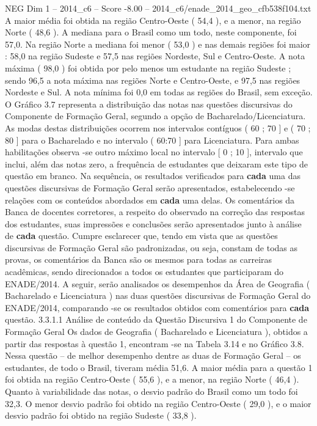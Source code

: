 \begin{textsample}{NEG Dim 1 – 2014\_c6 – Score -8.00 – 2014\_c6/enade\_2014\_geo\_cfb538f104.txt}
A maior média foi obtida na região Centro-Oeste ( 54,4 ), e a menor, na região Norte ( 48,6 ).
A mediana para o Brasil como um todo, neste componente, foi 57,0.
Na região Norte a mediana foi menor ( 53,0 ) e nas demais regiões foi maior : 58,0 na região Sudeste e 57,5 nas regiões Nordeste, Sul e Centro-Oeste.
A nota máxima ( 98,0 ) foi obtida por pelo menos um estudante na região Sudeste ; sendo 96,5 a nota máxima nas regiões Norte e Centro-Oeste, e 97,5 nas regiões Nordeste e Sul.
A nota mínima foi 0,0 em todas as regiões do Brasil, sem exceção.
O Gráfico 3.7 representa a distribuição das notas nas questões discursivas do Componente de Formação Geral, segundo a opção de Bacharelado/Licenciatura.
As modas destas distribuições ocorrem nos intervalos contíguos ( 60 ; 70 ] e ( 70 ; 80 ] para o Bacharelado e no intervalo ( 60:70 ] para Licenciatura.
Para ambas habilitações observa -se outro máximo local no intervalo [ 0 ; 10 ], intervalo que inclui, além das notas zero, a frequência de estudantes que deixaram este tipo de questão em branco.
Na sequência, os resultados verificados para \textbf{cada} uma das questões discursivas de Formação Geral serão apresentados, estabelecendo -se relações com os conteúdos abordados em \textbf{cada} uma delas.
Os comentários da Banca de docentes corretores, a respeito do observado na correção das respostas dos estudantes, suas impressões e conclusões serão apresentados junto à análise de \textbf{cada} questão.
Cumpre esclarecer que, tendo em vista que as questões discursivas de Formação Geral são padronizadas, ou seja, constam de todas as provas, os comentários da Banca são os mesmos para todas as carreiras acadêmicas, sendo direcionados a todos os estudantes que participaram do ENADE/2014.
A seguir, serão analisados os desempenhos da Área de Geografia ( Bacharelado e Licenciatura ) nas duas questões discursivas de Formação Geral do ENADE/2014, comparando -se os resultados obtidos com comentários para \textbf{cada} questão. 3.3.1.1 Análise de conteúdo da Questão Discursiva 1 do Componente de Formação Geral Os dados de Geografia ( Bacharelado e Licenciatura ), obtidos a partir das respostas à questão 1, encontram -se na Tabela 3.14 e no Gráfico 3.8.
Nessa questão – de melhor desempenho dentre as duas de Formação Geral – os estudantes, de todo o Brasil, tiveram média 51,6.
A maior média para a questão 1 foi obtida na região Centro-Oeste ( 55,6 ), e a menor, na região Norte ( 46,4 ).
Quanto à variabilidade das notas, o desvio padrão do Brasil como um todo foi 32,3.
O menor desvio padrão foi obtido na região Centro-Oeste ( 29,0 ), e o maior desvio padrão foi obtido na região Sudeste ( 33,8 ).

\end{textsample}
